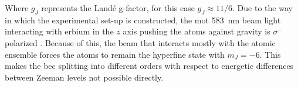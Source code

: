 Where $g_J$ represents the Landé g-factor, for this case $g_J\approx11/6$. Due to the way in which the experimental set-up is constructed, the \ac{mot} \SI{583}{\nano\meter} beam light interacting with erbium in the $z$ axis pushing the atoms against gravity  is $\sigma^-$ polarized \cite{Ulitzsch2016}. Because of this, the beam that interacts mostly with the atomic ensemble forces the atoms to remain the hyperfine state with $m_J = -6$. This makes the \ac{bec} splitting into different orders with respect to energetic differences between Zeeman levels not possible directly.
